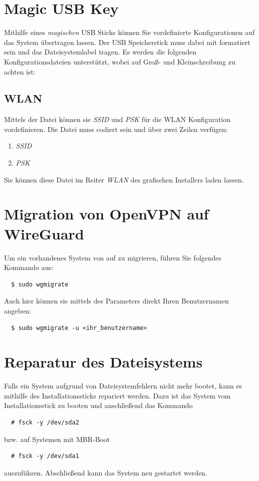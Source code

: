 \documentclass[a4paper,11pt,authoryear]{article}
\begin{document}
\section{Magic USB Key}
Mithilfe eines \emph{magischen} USB Sticks können Sie vordefinierte Konfigurationen auf das System übertragen lassen.
Der USB Speicherstick muss dabei mit  formatiert sein und das Dateisystemlabel  tragen.
Es werden die folgenden Konfigurationsdateien unterstützt, wobei auf Groß- und Kleinschreibung zu achten ist:

\subsection{WLAN}
Mittels der Datei  können sie \emph{SSID} und \emph{PSK} für die WLAN Konfiguration vordefinieren.
Die Datei muss  codiert sein und über zwei Zeilen verfügen:
\begin{enumerate}
  \item \emph{SSID}
  \item \emph{PSK}
\end{enumerate}

Sie können diese Datei im Reiter \emph{WLAN} des grafischen Installers laden lassen.

\section{Migration von OpenVPN auf WireGuard}
Um ein vorhandenes System von  auf  zu migrieren, führen Sie folgendes Kommando aus:
\begin{verbatim}
  $ sudo wgmigrate
\end{verbatim}
Auch hier können sie mittels des Parameters  direkt Ihren Benutzernamen angeben:
\begin{verbatim}
  $ sudo wgmigrate -u <ihr_benutzername>
\end{verbatim}

\section{Reparatur des Dateisystems}
Falls ein System aufgrund von Dateisystemfehlern nicht mehr bootet, kann es mithilfe des Installationssticks repariert werden.
Dazu ist das System vom Installationsstick zu booten und anschließend das Kommando
\begin{verbatim}
  # fsck -y /dev/sda2
\end{verbatim}
bzw. auf Systemen mit MBR-Boot
\begin{verbatim}
  # fsck -y /dev/sda1
\end{verbatim}
auszuführen.
Abschließend kann das System neu gestartet werden.

{}

\end{document}
